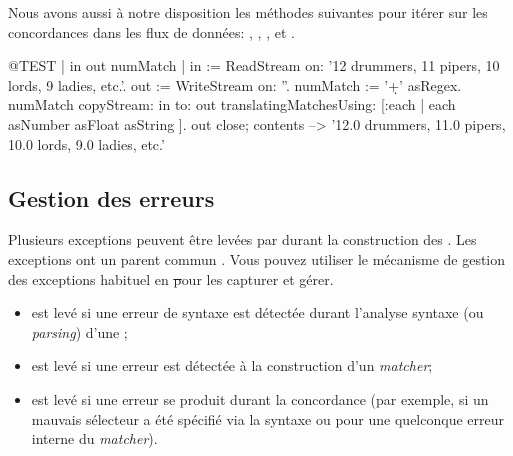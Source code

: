\documentclass[a4paper,10pt,twoside]{book}
\begin{document}
Nous avons aussi à notre disposition les méthodes suivantes pour
itérer sur les concordances dans les flux de données:
,
,
,
 et
.

\begin{code}{@TEST | in out numMatch |}
in := ReadStream on: '12 drummers, 11 pipers, 10 lords, 9 ladies, etc.'.
out := WriteStream on: ''.
numMatch := '\<\d+\>' asRegex.
numMatch
  copyStream: in
  to: out
  translatingMatchesUsing: [:each | each asNumber asFloat asString ].
out close; contents --> '12.0 drummers, 11.0 pipers, 10.0 lords, 9.0 ladies, etc.'
\end{code} %


\subsection{Gestion des erreurs}

Plusieurs exceptions peuvent être levées par  durant la
construction des \expregs. Les exceptions ont un parent commun
.
Vous pouvez utiliser le mécanisme de gestion des exceptions habituel
en \st pour les capturer et gérer.

\begin{itemize}
\item {} est levé si une erreur de syntaxe est
  détectée durant l'analyse syntaxe (ou \emph{parsing}) d'une \expreg;
\item {} est levé si une erreur est
  détectée à la construction d'un \emph{matcher};
\item {} est levé si une erreur se produit
  durant la concordance (par exemple, si un mauvais sélecteur a été
  spécifié via la syntaxe  ou pour une quelconque
  erreur interne du \emph{matcher}).



\end{itemize}
\end{document}
